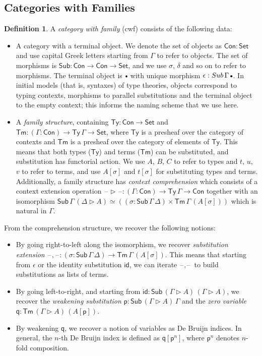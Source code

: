 \documentclass[a4paper,UKenglish,cleveref, autoref, thm-restate]{lipics-v2021}
\theoremstyle{remark}
\theoremstyle{definition}
\newtheorem{mydefinition}{Definition}
\newcommand{\Seti}{\mathsf{Set}}
\newcommand{\Con}{\mathsf{Con}}
\newcommand{\Ty}{\mathsf{Ty}}
\newcommand{\Tm}{\mathsf{Tm}}
\newcommand{\Sub}{\mathsf{Sub}}
\newcommand{\emptycon}{\scaleobj{.75}\bullet}
\newcommand{\id}{\mathsf{id}}
\newcommand{\ext}{\triangleright}
\newcommand{\blank}{\mathord{\hspace{1pt}\text{--}\hspace{1pt}}}
\newcommand{\p}{\mathsf{p}}
\newcommand{\q}{\mathsf{q}}
\begin{document}
\subsection{Categories with Families}
\label{sec:categories_with_families}

\begin{mydefinition}
A \emph{category with family} (cwf) \cite{Dybjer96internaltype} consists of the following data:
\begin{itemize}
\item A category with a terminal object. We denote the set of objects as $\Con :
  \Seti$ and use capital Greek letters starting from $\Gamma$ to refer to
  objects. The set of morphisms is $\Sub : \Con \to \Con \to \Seti$, and we use
  $\sigma$, $\delta$ and so on to refer to morphisms. The terminal object is
  $\emptycon$ with unique morphism $\epsilon : \Sub\,\Gamma\,\emptycon$. In
  initial models (that is, syntaxes) of type theories, objects correspond to
  typing contexts, morphisms to parallel substitutions and the terminal object to
  the empty context; this informs the naming scheme that we use here.
\item A \emph{family structure}, containing $\Ty : \Con \to \Seti$ and $\Tm :
  (\Gamma : \Con) \to \Ty\,\Gamma \to \Seti$, where $\Ty$ is a presheaf over the
  category of contexts and $\Tm$ is a presheaf over the category of elements of
  $\Ty$. This means that both types ($\Ty$) and terms ($\Tm$) can be
  substituted, and substitution has functorial action. We use $A$, $B$, $C$ to
  refer to types and $t$, $u$, $v$ to refer to terms, and use $A[\sigma]$ and
  $t[\sigma]$ for substituting types and terms. Additionally, a family structure
  has \emph{context comprehension} which consists of a context extension
  operation $\blank\ext\blank : (\Gamma : \Con) \to \Ty\,\Gamma \to \Con$
  together with an isomorphism $\Sub\,\Gamma\,(\Delta\ext A) \simeq ((\sigma :
  \Sub\,\Gamma\,\Delta) \times \Tm\,\Gamma\,(A[\sigma]))$ which is natural in
  $\Gamma$.
\end{itemize}
\end{mydefinition}

\noindent From the comprehension structure, we recover the following notions:

\begin{itemize}
\item By going right-to-left along the isomorphism, we recover \emph{substitution extension}
      $\blank,\blank : (\sigma : \Sub\,\Gamma\,\Delta) \to \Tm\,\Gamma\,(A[\sigma])$. This means
      that starting from $\epsilon$ or the identity substitution $\id$, we can iterate $\blank,\blank$
      to build substitutions as lists of terms.
\item By going left-to-right, and starting from $\id : \Sub\,(\Gamma\ext A)\,(\Gamma\ext A)$, we recover
      the \emph{weakening substitution} $\p : \Sub\,(\Gamma\ext A)\,\Gamma$ and the \emph{zero variable}
      $\q : \Tm\,(\Gamma\ext A)\,(A[\p])$.
\item By weakening $\q$, we recover a notion of variables as De Bruijn indices. In general, the $n$-th
      De Bruijn index is defined as $\q[\p^{n}]$, where $\p^{n}$ denotes $n$-fold composition.
\end{itemize}
\end{document}
